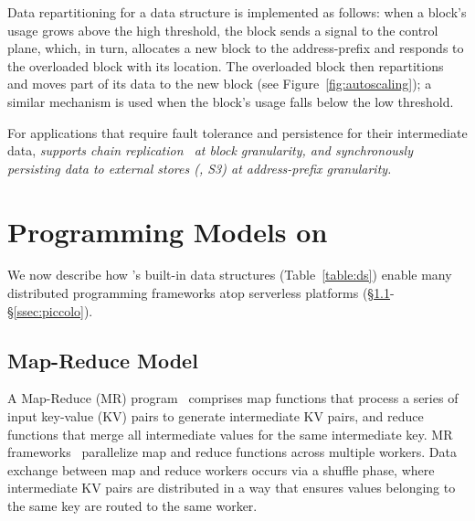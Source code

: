 Data repartitioning for a \jiffy data structure is implemented as follows: when a block's usage grows above the high threshold, the block sends a signal to the control plane, which, in turn, allocates a new block to the address-prefix and responds to the overloaded block with its location. The overloaded block then repartitions and moves part of its data to the new block (see Figure~\ref{fig:autoscaling}); a similar mechanism is used when the block's usage falls below the low threshold. %

For applications that require fault tolerance and persistence for their intermediate data, \sl supports chain replication~\cite{chainreplication} at block granularity, and synchronously persisting data to external stores (\eg, S3) at address-prefix granularity.


\section{Programming Models on \jiffy}
\label{sec:models}

We now describe how \jiffy's built-in data structures (Table~\ref{table:ds}) 
enable many distributed programming frameworks atop serverless platforms 
(\S\ref{ssec:bsp}-\S\ref{ssec:piccolo}). 


\subsection{Map-Reduce Model}
\label{ssec:bsp}

A Map-Reduce (MR) program~\cite{mapreduce} comprises map
functions that process a series of input key-value (KV) pairs 
to generate intermediate KV pairs, and reduce functions that merge 
all intermediate values for the same intermediate key. MR 
frameworks~\cite{mapreduce, hadoop, spark} parallelize map and reduce 
functions across multiple workers. Data exchange between
map and reduce workers occurs via a shuffle phase, where intermediate
KV pairs are distributed in a way that ensures values belonging
to the same key are routed to the same worker.

